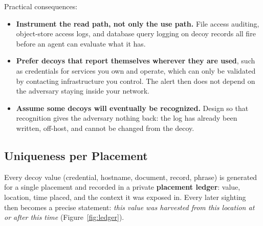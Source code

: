 \documentclass[11pt,letterpaper]{article}
\begin{document}
Practical consequences:

\begin{itemize}
  \item \textbf{Instrument the read path, not only the use path.} File access auditing, object-store access logs, and database query logging on decoy records all fire before an agent can evaluate what it has.
  \item \textbf{Prefer decoys that report themselves wherever they are used}, such as credentials for services you own and operate, which can only be validated by contacting infrastructure you control. The alert then does not depend on the adversary staying inside your network.
  \item \textbf{Assume some decoys will eventually be recognized.} Design so that recognition gives the adversary nothing back: the log has already been written, off-host, and cannot be changed from the decoy.
\end{itemize}

\subsection{Uniqueness per Placement}
\label{sec:unique}

Every decoy value (credential, hostname, document, record, phrase) is generated for a single placement and recorded in a private \textbf{placement ledger}: value, location, time placed, and the context it was exposed in. Every later sighting then becomes a precise statement: \emph{this value was harvested from this location at or after this time} (Figure~\ref{fig:ledger}).
\end{document}

